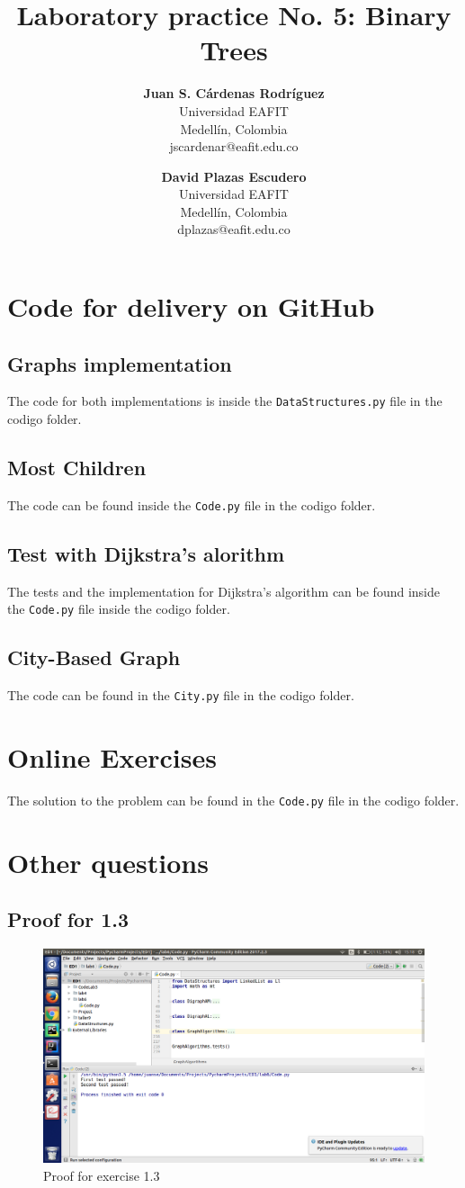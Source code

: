 \documentclass[a4paper,12pt]{article}
\title{\color{Eblue}\textbf{Laboratory practice No. 5: Binary Trees}}
\author{
  \textbf{Juan S. Cárdenas Rodríguez}\\
  Universidad EAFIT\\
  Medellín, Colombia\\
  jscardenar@eafit.edu.co
\and
  \textbf{David Plazas Escudero}\\
  Universidad EAFIT\\
  Medellín, Colombia\\
  dplazas@eafit.edu.co
}
\begin{document}
  \maketitle
  \thispagestyle{fancy}
  \section{Code for delivery on GitHub}
    \subsection{Graphs implementation}
      The code for both implementations is inside the \texttt{DataStructures.py} file in the codigo folder.
    \subsection{Most Children}
      The code can be found inside the \texttt{Code.py} file in the codigo folder.
    \subsection{Test with Dijkstra's alorithm}
      The tests and the implementation for Dijkstra's algorithm can be found inside the \texttt{Code.py} file
      inside the codigo folder.
    \subsection{City-Based Graph}
      The code can be found in the \texttt{City.py} file in the codigo folder.
  \section{Online Exercises}
    The solution to the problem can be found in the \texttt{Code.py} file in the codigo folder.
  \section{Other questions}
    \subsection{Proof for 1.3}
      \begin{figure}[H]
        \includegraphics[scale=0.3]{appro.png}
        \caption{Proof for exercise 1.3}
      \end{figure}
\end{document}
